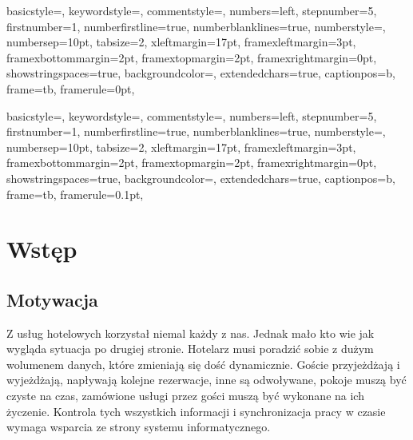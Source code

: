 \documentclass[a4paper,onecolumn,oneside,11pt,wide,floatssmall]{mwrep}
\theoremstyle{definition}
\theoremstyle{plain}%
\theoremstyle{remark}
\begin{document}
{
basicstyle={\footnotesize},
keywordstyle={\bf\footnotesize\color{blue}},
commentstyle={\em\footnotesize\color{magenta}},
numbers=left,
stepnumber=5,
firstnumber=1,
numberfirstline=true,
numberblanklines=true,
numberstyle={\sf\tiny},
numbersep=10pt,
tabsize=2,
xleftmargin=17pt,
framexleftmargin=3pt,
framexbottommargin=2pt,
framextopmargin=2pt,
framexrightmargin=0pt,
showstringspaces=true,
backgroundcolor={\color{ListingBackground}},
extendedchars=true,
captionpos=b,
frame=tb,
framerule=0pt,
}

{
basicstyle={\footnotesize},
keywordstyle={\bf\footnotesize\color{blue}},
commentstyle={\em\footnotesize\color{magenta}},
numbers=left,
stepnumber=5,
firstnumber=1,
numberfirstline=true,
numberblanklines=true,
numberstyle={\sf\tiny},
numbersep=10pt,
tabsize=2,
xleftmargin=17pt,
framexleftmargin=3pt,
framexbottommargin=2pt,
framextopmargin=2pt,
framexrightmargin=0pt,
showstringspaces=true,
backgroundcolor={\color{ListingBackground}},
extendedchars=true,
captionpos=b,
frame=tb,
framerule=0.1pt,
}

\renewcommand*\lstlistingname{Wydruk}
\renewcommand*\lstlistlistingname{Spis wydruków}

\renewcommand{\baselinestretch}{1.0}
\raggedbottom



\tableofcontents


\newpage
{}
\setcounter{page}{1}


\chapter{Wstęp}
\section{Motywacja}
Z usług hotelowych korzystał niemal każdy z nas. Jednak mało kto wie jak wygląda sytuacja po drugiej stronie. Hotelarz musi poradzić sobie z dużym wolumenem danych, które zmieniają się dość dynamicznie. Goście przyjeżdżają i wyjeżdżają, napływają kolejne rezerwacje, inne są odwoływane, pokoje muszą być czyste na czas, zamówione usługi przez gości muszą być wykonane na ich życzenie. Kontrola tych wszystkich informacji i synchronizacja pracy w czasie wymaga wsparcia ze strony systemu informatycznego.
\end{document}
